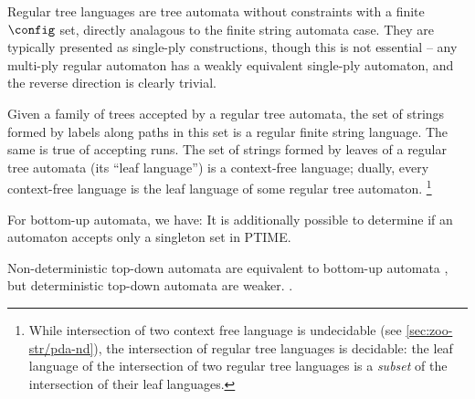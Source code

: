 Regular tree languages are tree automata without constraints with a finite
$\config$ set, directly analagous to the finite string automata case.  They
are typically presented as single-ply constructions, though this is not
essential -- any multi-ply regular automaton has a weakly equivalent
single-ply automaton, and the reverse direction is clearly trivial.

Given a family of trees accepted by a regular tree automata, the set of
strings formed by labels along paths in this set is a regular finite string
language.  The same is true of accepting runs.  The set of strings formed by
leaves of a regular tree automata (its ``leaf language'') is a context-free
language; dually, every context-free language is the leaf language of some
regular tree automaton.%
%
\footnote{While intersection of two context free language is undecidable
(see \autoref{sec:zoo-str/pda-nd}), the intersection of regular tree languages
is decidable: the leaf language of the intersection of two regular tree
languages is a {\em subset} of the intersection of their leaf languages.}

For bottom-up automata, we have:
It is additionally possible to determine if an automaton accepts only a
singleton set in PTIME.

Non-deterministic top-down automata are equivalent to bottom-up automata
\cite[Thm 1.6.1]{tata}, but deterministic top-down automata are weaker.
\cite[Prop 1.6.2]{tata}.
